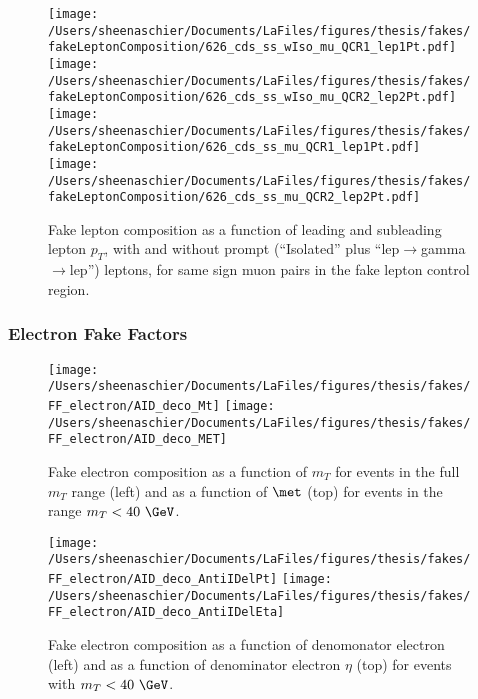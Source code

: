 \documentclass[11pt, oneside]{article}   	%
\begin{document}
\begin{figure}[htb]
        \centering
        \texttt{[image: /Users/sheenaschier/Documents/LaFiles/figures/thesis/fakes/fakeLeptonComposition/626\_cds\_ss\_wIso\_mu\_QCR1\_lep1Pt.pdf]}
        \texttt{[image: /Users/sheenaschier/Documents/LaFiles/figures/thesis/fakes/fakeLeptonComposition/626\_cds\_ss\_wIso\_mu\_QCR2\_lep2Pt.pdf]}
        \texttt{[image: /Users/sheenaschier/Documents/LaFiles/figures/thesis/fakes/fakeLeptonComposition/626\_cds\_ss\_mu\_QCR1\_lep1Pt.pdf]}
        \texttt{[image: /Users/sheenaschier/Documents/LaFiles/figures/thesis/fakes/fakeLeptonComposition/626\_cds\_ss\_mu\_QCR2\_lep2Pt.pdf]}
        \caption{Fake lepton composition as a function of leading and subleading lepton $p_{T}$, with and without prompt (``Isolated'' plus ``lep$\to$gamma$\to$lep'') leptons, for same sign muon pairs in the fake lepton control region.}
        \label{fig:muSSCR}
\end{figure}
 \FloatBarrier
 
\subsubsection{Electron Fake Factors}
\begin{figure}[htb]
        \centering
        \texttt{[image: /Users/sheenaschier/Documents/LaFiles/figures/thesis/fakes/FF\_electron/AID\_deco\_Mt]}
        \texttt{[image: /Users/sheenaschier/Documents/LaFiles/figures/thesis/fakes/FF\_electron/AID\_deco\_MET]}
        \caption{Fake electron composition as a function of $m_{T}$ for events in the full $m_{T}$ range (left) and as a function of $\met$ (top) for events in the range $m_{T}<40~\GeV$. }
        \label{fig:elDeco_1}
\end{figure}
\begin{figure}[htb]
        \centering
        \texttt{[image: /Users/sheenaschier/Documents/LaFiles/figures/thesis/fakes/FF\_electron/AID\_deco\_AntiIDelPt]}
        \texttt{[image: /Users/sheenaschier/Documents/LaFiles/figures/thesis/fakes/FF\_electron/AID\_deco\_AntiIDelEta]}
        \caption{Fake electron composition as a function of denomonator electron \pt{} (left) and as a function of denominator electron $\eta$ (top) for events with $m_{T} < 40~\GeV$. }
        \label{fig:elDeco_2}
\end{figure}
\end{document}

